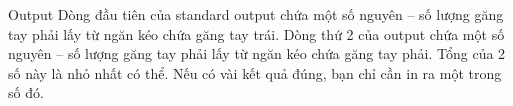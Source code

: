 Output  
Dòng đầu tiên của standard output chứa một số nguyên – số lượng găng tay phải lấy từ ngăn kéo chứa găng tay trái. Dòng thứ 2 của output chứa một số nguyên – số lượng găng tay phải lấy từ ngăn kéo chứa găng tay phải. Tổng của 2 số này là nhỏ nhất có thể. Nếu có vài kết quả đúng, bạn chỉ cần in ra một trong số đó.